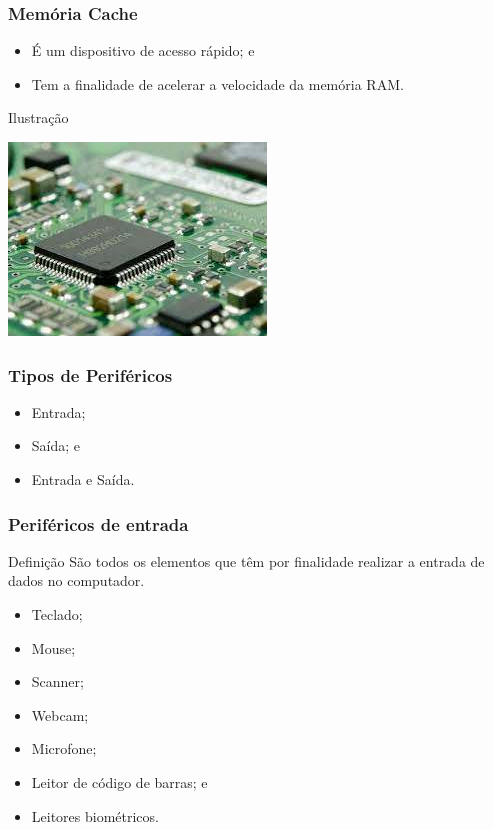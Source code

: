 \documentclass[aspectratio=169]{beamer} %
\begin{document}
\begin{frame}
	\frametitle{Memória Cache}
		
	\begin{itemize}
		\item É um dispositivo de acesso rápido; e
		\item Tem a finalidade de acelerar a velocidade da memória RAM.
	\end{itemize}\vfill
	
	\begin{exampleblock}{Ilustra\c cão}
		\begin{center}
			\includegraphics[scale=0.4]{img/cache}
		\end{center}		
	\end{exampleblock}
\end{frame}

\begin{frame}
	\frametitle{Tipos de Periféricos}
		
	\begin{itemize}
		\item Entrada;
		\item Saída; e
		\item Entrada e Saída.
	\end{itemize}
\end{frame}

\begin{frame}
	\frametitle{Periféricos de entrada}
	
	\begin{block}{Defini\c cão}
		São todos os elementos que têm por finalidade realizar a entrada de dados no computador.
	\end{block}\vfill
	
	\begin{itemize}
		\item Teclado;
		\item Mouse;
		\item Scanner;
		\item Webcam;
		\item Microfone;
		\item Leitor de código de barras; e
		\item Leitores biométricos.
	\end{itemize}
\end{frame}
\end{document}
